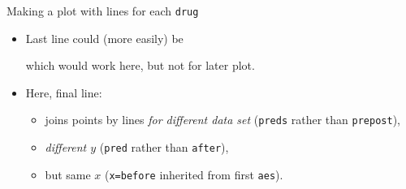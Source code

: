 \begin{frame}[fragile]{Making a plot with lines for each \texttt{drug}}

 
\begin{knitrout}
\color{fgcolor}\begin{kframe}
\begin{alltt}
\hlkwb{=}
  \hlstd{(}\hlopt{+}
  \hlstd{()}\hlopt{+}
  \hlstd{(}\hlstd{(}
\end{alltt}
\end{kframe}
\end{knitrout}


\begin{itemize}
\item Last line could (more easily) be 

\begin{knitrout}
\color{fgcolor}\begin{kframe}
\begin{alltt}
\hlstd{(}\hlstd{=}\hlstd{,}
\end{alltt}
\end{kframe}
\end{knitrout}

which would work here, but not for later plot.
\item Here, final line:
  \begin{itemize}
  \item   joins points by lines \emph{for different data
    set} (\texttt{preds} rather than \texttt{prepost}),
\item   \emph{different $y$} (\texttt{pred} rather than \texttt{after}),
  
\item but same $x$ (\texttt{x=before} inherited from first \texttt{aes}).

  \end{itemize}
  
\end{itemize}
  
  
\end{frame}

